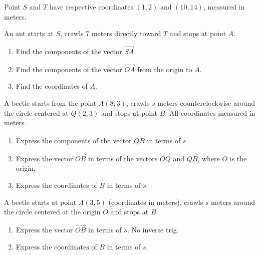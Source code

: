 \documentclass{ximera}
\begin{document}
\begin{question}  \label{QOKDlerdfsre}
Point $S$ and $T$ have respective coordinates $(1,2)$ and $(10,14)$, measured in meters.

An ant starts at $S$, crawls $7$ meters directly toward $T$ and stops at point $A$.

\begin{enumerate}
\item Find the components of the vector $\overrightarrow{SA}$.

\item Find the components of the vector $\overrightarrow{OA}$ from the origin to $A$.

\item Find the coordinates of $A$.
\end{enumerate}

\end{question}


\begin{question}  \label{QDfgegsE}
A beetle starts from the point $A(8,3)$, crawls $s$ meters counterclockwise around the circle centered at $Q(2,3)$ and stops at point $B$. All coordinates measured in meters.

\begin{enumerate}
\item Express the components of the vector $\overrightarrow{QB}$ in terms of $s$.

\item Express the vector $\overrightarrow{OB}$ in terms of the vectors $\overrightarrow{OQ}$ and $\overrightarrow{QB}$, where $O$ is the origin.

\item Express the coordinates of $B$ in terms of $s$.
\end{enumerate}
\end{question}


\begin{question} \label{QIDIFDfeD}
A beetle starts at point $A(3,5)$ (coordinates in meters), crawls $s$ meters around the circle centered at the origin $O$ and stops at $B$.

\begin{enumerate}
\item Express the vector $\overrightarrow{OB}$ in terms of $s$. No inverse trig.

\item Express the coordinates of $B$ in terms of $s$.
\end{enumerate}
\end{question}
\end{document}
